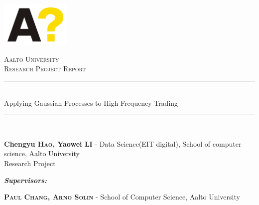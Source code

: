 \documentclass[12pt]{article}
\begin{document}
\begin{titlepage}

\newcommand{\HRule}{\rule{\linewidth}{0.5mm}} %

\center %
 
\includegraphics[width=0.25\textwidth]{fig/aalto_logo.png}

\textsc{\LARGE Aalto University}\\[2 cm]

\textsc{\LARGE Research Project Report}\\[0.3cm] %


\HRule \\[0.4cm]
{ \huge Applying Gaussian Processes to High Frequency Trading}\\[0.4cm]
\HRule \\[0.4cm]
 


{\raggedright
\textbf{Chengyu \textsc{Hao}, Yaowei \textsc{LI}} - Data Science(EIT digital), School of computer science, Aalto University \\
Research Project 
\\[3mm]}


\textbf{\emph{Supervisors:}} \\[2mm]
{\raggedright
\textbf{\textsc{Paul Chang, Arno Solin}} - School of Computer Science, Aalto University\\[1mm]
}


\end{titlepage}
\end{document}
